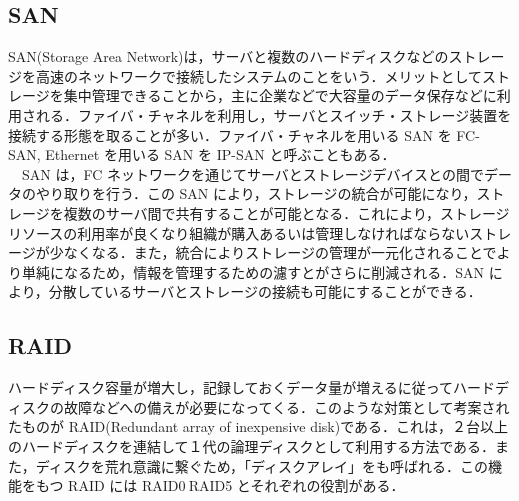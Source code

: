 \documentclass[a4j,titlepage]{jarticle}
\begin{document}
\subsection{SAN}
SAN(Storage Area Network)は，サーバと複数のハードディスクなどのストレージを高速のネットワークで接続したシステムのことをいう．メリットとしてストレージを集中管理できることから，主に企業などで大容量のデータ保存などに利用される．ファイバ・チャネルを利用し，サーバとスイッチ・ストレージ装置を接続する形態を取ることが多い．ファイバ・チャネルを用いる SAN を FC-SAN, Ethernet を用いる SAN を IP-SAN と呼ぶこともある．\\
　SAN は，FC ネットワークを通じてサーバとストレージデバイスとの間でデータのやり取りを行う．この SAN により，ストレージの統合が可能になり，ストレージを複数のサーバ間で共有することが可能となる．これにより，ストレージリソースの利用率が良くなり組織が購入あるいは管理しなければならないストレージが少なくなる．また，統合によりストレージの管理が一元化されることでより単純になるため，情報を管理するための濾すとがさらに削減される．SAN により，分散しているサーバとストレージの接続も可能にすることができる\cite{bib:iptext}\cite{bib:santext}．\\

\subsection{RAID}
ハードディスク容量が増大し，記録しておくデータ量が増えるに従ってハードディスクの故障などへの備えが必要になってくる．このような対策として考案されたものが RAID(Redundant array of inexpensive disk)である．これは，２台以上のハードディスクを連結して１代の論理ディスクとして利用する方法である．また，ディスクを荒れ意識に繋ぐため，「ディスクアレイ」をも呼ばれる．この機能をもつ RAID には RAID0$~$RAID5 とそれぞれの役割がある．
\end{document}
